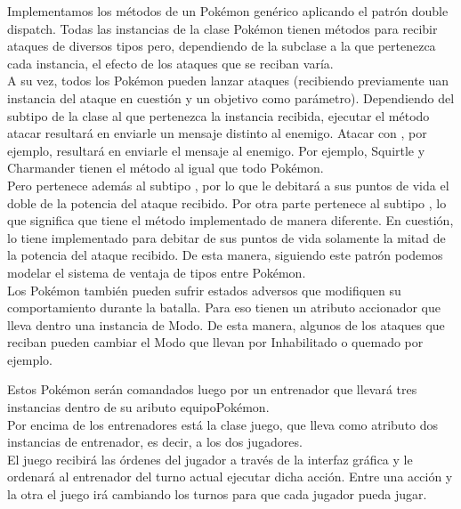 Implementamos los métodos de un Pokémon genérico aplicando el patrón double dispatch.
Todas las instancias de la clase Pokémon tienen métodos para recibir ataques de diversos tipos pero,
dependiendo de la subclase a la que pertenezca cada instancia, el efecto de los ataques que se
reciban varía. \\

A su vez, todos los Pokémon pueden lanzar ataques (recibiendo previamente uan instancia del ataque
en cuestión y un objetivo como parámetro). Dependiendo del subtipo de la clase  al que pertenezca la
instancia recibida, ejecutar el método atacar resultará en enviarle un mensaje distinto al enemigo.
Atacar con , por ejemplo, resultará en enviarle el mensaje  al enemigo.
Por ejemplo, Squirtle y Charmander tienen el método  al igual que todo Pokémon. \\
Pero  pertenece además al subtipo , por lo que 
le debitará a sus puntos de vida el doble de la potencia del ataque recibido. Por otra parte 
pertenece al subtipo , lo que significa que tiene el método 
implementado de manera diferente. En cuestión, lo tiene implementado para debitar de sus puntos de
vida solamente la mitad de la potencia del ataque recibido. De esta manera, siguiendo este patrón
podemos modelar el sistema de ventaja de tipos entre Pokémon. \\

Los Pokémon también pueden sufrir estados adversos que modifiquen su comportamiento durante la batalla.
Para eso tienen un atributo accionador que lleva dentro una instancia de Modo. De esta manera, algunos
de los ataques que reciban pueden cambiar el Modo que llevan por Inhabilitado o quemado por ejemplo.

Estos Pokémon serán comandados luego por un entrenador que llevará tres instancias dentro de su
aributo equipoPokémon. \\

Por encima de los entrenadores está la clase juego, que lleva como atributo dos instancias de entrenador,
es decir, a los dos jugadores. \\

El juego recibirá las órdenes del jugador a través de la interfaz gráfica y le ordenará al entrenador
del turno actual ejecutar dicha acción. Entre una acción y la otra el juego irá cambiando los turnos
para que cada jugador pueda jugar.